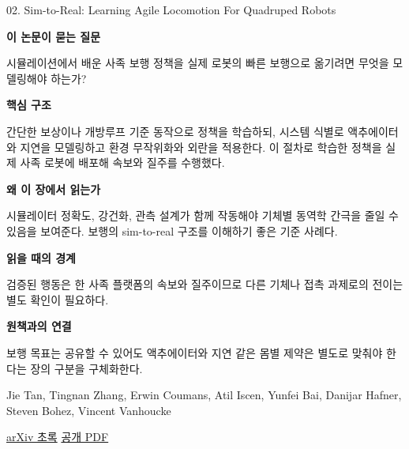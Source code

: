 \documentclass[11pt,openany]{book}
\begin{document}
\begin{termcard}{02. Sim-to-Real: Learning Agile Locomotion For Quadruped Robots}

\par

\medskip

{\sffamily\bfseries\color{deepblue} 이 논문이 묻는 질문}\par

시뮬레이션에서 배운 사족 보행 정책을 실제 로봇의 빠른 보행으로 옮기려면 무엇을 모델링해야 하는가?

\smallskip

{\sffamily\bfseries\color{deepblue} 핵심 구조}\par

간단한 보상이나 개방루프 기준 동작으로 정책을 학습하되, 시스템 식별로 액추에이터와 지연을 모델링하고 환경 무작위화와 외란을 적용한다. 이 절차로 학습한 정책을 실제 사족 로봇에 배포해 속보와 질주를 수행했다.

\smallskip

{\sffamily\bfseries\color{deepblue} 왜 이 장에서 읽는가}\par

시뮬레이터 정확도, 강건화, 관측 설계가 함께 작동해야 기체별 동역학 간극을 줄일 수 있음을 보여준다. 보행의 sim-to-real 구조를 이해하기 좋은 기준 사례다.

\smallskip

{\sffamily\bfseries\color{coral} 읽을 때의 경계}\par

검증된 행동은 한 사족 플랫폼의 속보와 질주이므로 다른 기체나 접촉 과제로의 전이는 별도 확인이 필요하다.

\smallskip

{\sffamily\bfseries\color{teal} 원책과의 연결}\par

보행 목표는 공유할 수 있어도 액추에이터와 지연 같은 몸별 제약은 별도로 맞춰야 한다는 장의 구분을 구체화한다.

\medskip

{\footnotesize\color{muted} Jie Tan, Tingnan Zhang, Erwin Coumans, Atil Iscen, Yunfei Bai, Danijar Hafner, Steven Bohez, Vincent Vanhoucke\par

\href{https://arxiv.org/abs/1804.10332}{arXiv 초록} \quad \href{https://arxiv.org/pdf/1804.10332}{공개 PDF}\par}

\end{termcard}
\end{document}

